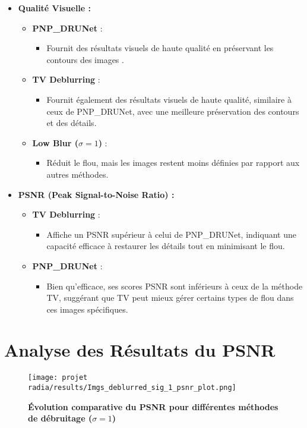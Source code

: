 \documentclass[a4paper, 12pt]{report} %
\begin{document}
\begin{itemize}
    \item \textbf{Qualité Visuelle :}
    \begin{itemize}
        \item \textbf{PNP\_DRUNet} :
        \begin{itemize}
            \item Fournit des résultats visuels de haute qualité en préservant les contours des images .
        \end{itemize}
        \item \textbf{TV Deblurring} :
        \begin{itemize}
            \item Fournit également des résultats visuels de haute qualité, similaire à ceux de PNP\_DRUNet, avec une meilleure préservation des contours et des détails.
        \end{itemize}
        \item \textbf{Low Blur ($\sigma = 1$)} :
        \begin{itemize}
            \item Réduit le flou, mais les images restent moins définies par rapport aux autres méthodes.
        \end{itemize}
    \end{itemize}

    \item \textbf{PSNR (Peak Signal-to-Noise Ratio) :}
    \begin{itemize}
        \item \textbf{TV Deblurring} :
        \begin{itemize}
            \item Affiche un PSNR supérieur à celui de PNP\_DRUNet, indiquant une capacité efficace à restaurer les détails tout en minimisant le flou.
        \end{itemize}
        \item \textbf{PNP\_DRUNet} :
        \begin{itemize}
            \item Bien qu'efficace, ses scores PSNR sont inférieurs à ceux de la méthode TV, suggérant que TV peut mieux gérer certains types de flou dans ces images spécifiques.
        \end{itemize}
       
    \end{itemize}
\end{itemize}
\section*{Analyse des Résultats du PSNR}
\begin{figure}[H]
    \centering
    \texttt{[image: projet radia/results/Imgs\_deblurred\_sig\_1\_psnr\_plot.png]}
    \caption{ \textbf{Évolution comparative du PSNR pour différentes méthodes de débruitage (\(\sigma = 1\))}
 }
    \label{fig:8}
\end{figure} 
\end{document}
